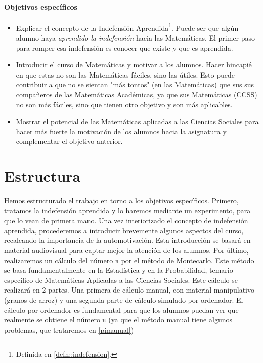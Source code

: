 \paragraph{Objetivos específicos}
\begin{itemize}
	\item Explicar el concepto de la Indefensión Aprendida\footnote{Definida en \ref{defn::indefension}.}. Puede ser que algún alumno haya \textit{aprendido la indefensión} hacia las Matemáticas. El primer paso para romper esa indefensión es conocer que existe y que es aprendida.
	\item Introducir el curso de Matemáticas y motivar a los alumnos.
	\subitem Hacer hincapié en que estas no son las Matemáticas fáciles, sino las útiles. Esto puede contribuir a que no se sientan "más tontos" (en las Matemáticas) que sus sus compañeros de las Matemáticas Académicas, ya que sus Matemáticas (CCSS) no son más fáciles, sino que tienen otro objetivo y son más aplicables.
	\item Mostrar el potencial de las Matemáticas aplicadas a las Ciencias Sociales para hacer más fuerte la motivación de los alumnos hacia la asignatura y complementar el objetivo anterior.
\end{itemize}

\section{Estructura}

Hemos estructurado el trabajo en torno a los objetivos específicos. 
%
Primero, tratamos la indefensión aprendida y lo haremos mediante un experimento, para que lo vean de primera mano.
%
Una vez interiorizado el concepto de indefensión aprendida, procederemos a introducir brevemente algunos aspectos del curso, recalcando la importancia de la automotivación.
%
Esta introducción se basará en material audiovisual para captar mejor la atención de los alumnos.
%
Por último, realizaremos un cálculo del número π por el método de Montecarlo. 
%
Este método se basa fundamentalmente en la Estadística y en la Probabilidad, temario específico de Matemáticas Aplicadas a las Ciencias Sociales.
%
Este cálculo se realizará en 2 partes. Una primera de cálculo manual, con material manipulativo (granos de arroz) y una segunda parte de cálculo simulado por ordenador.
%
El cálculo por ordenador es fundamental para que los alumnos puedan ver que realmente se obtiene el número π (ya que el método manual tiene algunos problemas, que trataremos en \ref{pimanual})

